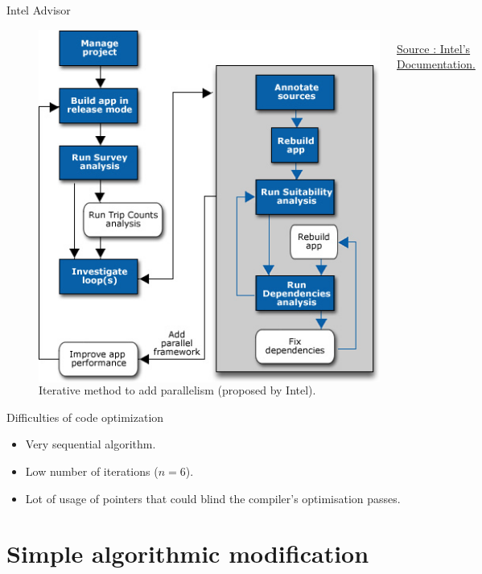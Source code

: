 \documentclass{beamer}
\begin{document}
\begin{frame}{Intel Advisor}
	\begin{figure}
	\begin{columns}
      \includegraphics[width=\textwidth]{Intel.jpg}
      \caption{Iterative method to add parallelism (proposed by Intel).\label{Fig:intel_iter}}{\href{https://software.intel.com/en-us/articles/avoiding-and-identifying-false-sharing-among-threads}{Source : Intel's Documentation.}}
    \end{columns}	
    \end{figure}
\end{frame}


\begin{frame}{Difficulties of code optimization}
\begin{itemize}
\item
Very sequential algorithm.
\item
Low number of iterations ($n = 6$).
\item
Lot of usage of pointers that could blind the compiler's optimisation passes.
\end{itemize}
\end{frame}

\section{Simple algorithmic modification}
\end{document}
